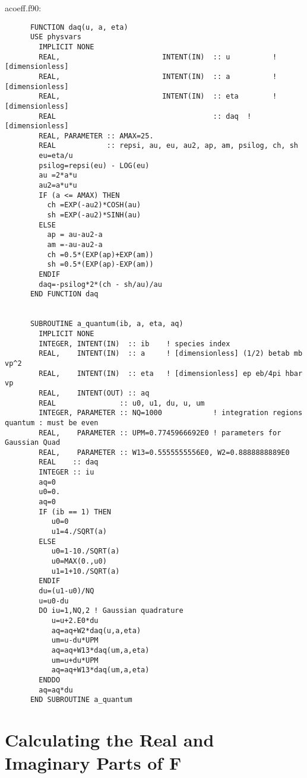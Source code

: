 \documentclass[preprint,12pt,eqsecnum,nofootinbib,amsmath,amssymb]{revtex4}
\begin{document}
{{\vskip1cm 
\noindent
acoeff.f90:
{
\baselineskip 10pt
\begin{verbatim}
      FUNCTION daq(u, a, eta)
      USE physvars
        IMPLICIT NONE
        REAL,                        INTENT(IN)  :: u          ! [dimensionless]
        REAL,                        INTENT(IN)  :: a          ! [dimensionless]
        REAL,                        INTENT(IN)  :: eta        ! [dimensionless]
        REAL                                     :: daq  ! [dimensionless]
        REAL, PARAMETER :: AMAX=25.
        REAL            :: repsi, au, eu, au2, ap, am, psilog, ch, sh
        eu=eta/u 
        psilog=repsi(eu) - LOG(eu)
        au =2*a*u
        au2=a*u*u
        IF (a <= AMAX) THEN      
          ch =EXP(-au2)*COSH(au)
          sh =EXP(-au2)*SINH(au)
        ELSE
          ap = au-au2-a
          am =-au-au2-a
          ch =0.5*(EXP(ap)+EXP(am))
          sh =0.5*(EXP(ap)-EXP(am))
        ENDIF
        daq=-psilog*2*(ch - sh/au)/au
      END FUNCTION daq


      SUBROUTINE a_quantum(ib, a, eta, aq)
        IMPLICIT NONE
        INTEGER, INTENT(IN)  :: ib    ! species index
        REAL,    INTENT(IN)  :: a     ! [dimensionless] (1/2) betab mb vp^2
        REAL,    INTENT(IN)  :: eta   ! [dimensionless] ep eb/4pi hbar vp
        REAL,    INTENT(OUT) :: aq 
        REAL               :: u0, u1, du, u, um
        INTEGER, PARAMETER :: NQ=1000            ! integration regions quantum : must be even
        REAL,    PARAMETER :: UPM=0.7745966692E0 ! parameters for Gaussian Quad
        REAL,    PARAMETER :: W13=0.5555555556E0, W2=0.8888888889E0
        REAL    :: daq
        INTEGER :: iu
        aq=0
        u0=0.
        aq=0
        IF (ib == 1) THEN
           u0=0
           u1=4./SQRT(a)
        ELSE
           u0=1-10./SQRT(a)
           u0=MAX(0.,u0)  
           u1=1+10./SQRT(a)
        ENDIF
        du=(u1-u0)/NQ
        u=u0-du
        DO iu=1,NQ,2 ! Gaussian quadrature
           u=u+2.E0*du
           aq=aq+W2*daq(u,a,eta)
           um=u-du*UPM
           aq=aq+W13*daq(um,a,eta)
           um=u+du*UPM
           aq=aq+W13*daq(um,a,eta)
        ENDDO
        aq=aq*du
      END SUBROUTINE a_quantum
\end{verbatim}
}






\pagebreak
\appendix



\section{Calculating the Real and Imaginary Parts of F}
\label{app:FrFi}

}}
\end{document}
